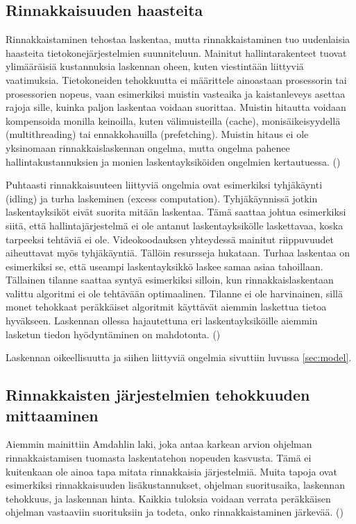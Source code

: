 \subsection{Rinnakkaisuuden haasteita}

Rinnakkaistaminen tehostaa laskentaa, mutta rinnakkaistaminen tuo
uudenlaisia haasteita tietokonejärjestelmien suunniteluun. Mainitut
hallintarakenteet tuovat ylimääräisiä kustannuksia laskennan oheen,
kuten viestintään liittyviä vaatimuksia.
Tietokoneiden tehokkuutta ei määrittele ainoastaan prosessorin tai
prosessorien nopeus, vaan esimerkiksi muistin vasteaika ja kaistanleveys
asettaa rajoja sille, kuinka paljon laskentaa voidaan suorittaa. Muistin
hitautta voidaan kompensoida monilla keinoilla, kuten välimuisteilla (cache),
monisäikeisyydellä (multithreading) tai ennakkohauilla (prefetching). Muistin
hitaus ei ole yksinomaan rinnakkaislaskennan ongelma, mutta ongelma pahenee
hallintakustannuksien ja monien laskentayksiköiden ongelmien kertautuessa.
(\citealt{intro})

Puhtaasti rinnakkaisuuteen liittyviä ongelmia ovat esimerkiksi tyhjäkäynti
(idling) ja turha laskeminen (excess computation). Tyhjäkäynnissä jotkin
laskentayksiköt eivät suorita mitään laskentaa. Tämä saattaa johtua esimerkiksi
siitä, että hallintajärjestelmä ei ole antanut laskentayksikölle laskettavaa,
koska tarpeeksi tehtäviä ei ole. Videokoodauksen yhteydessä mainitut
riippuvuudet aiheuttavat myös tyhjäkäyntiä. Tällöin resursseja hukataan. Turhaa
laskentaa on esimerkiksi se, että useampi laskentayksikkö laskee samaa asiaa
tahoillaan. Tällainen tilanne saattaa syntyä esimerkiksi silloin, kun
rinnakkaislaskentaan valittu algoritmi ei ole tehtävään optimaalinen. Tilanne
ei ole harvinainen, sillä monet tehokkaat peräkkäiset algoritmit käyttävät
aiemmin laskettua tietoa hyväkseen. Laskennan ollessa hajautettuna eri
laskentayksiköille aiemmin lasketun tiedon hyödyntäminen on mahdotonta.
(\citealt{intro})

Laskennan oikeellisuutta ja siihen liittyviä ongelmia sivuttiin luvussa
\ref{sec:model}.

\subsection{Rinnakkaisten järjestelmien tehokkuuden mittaaminen}
\label{sec:measurement}

Aiemmin mainittiin Amdahlin laki, joka antaa karkean arvion ohjelman
rinnakkaistamisen tuomasta laskentatehon nopeuden kasvusta. Tämä ei kuitenkaan
ole ainoa tapa mitata rinnakkaisia järjestelmiä. Muita tapoja ovat esimerkiksi
rinnakkaisuuden lisäkustannukset, ohjelman suoritusaika, laskennan
tehokkuus, ja laskennan hinta. Kaikkia tuloksia voidaan verrata peräkkäisen
ohjelman vastaaviin suorituksiin ja todeta, onko rinnakkaistaminen järkevää.
(\citealt{intro})

